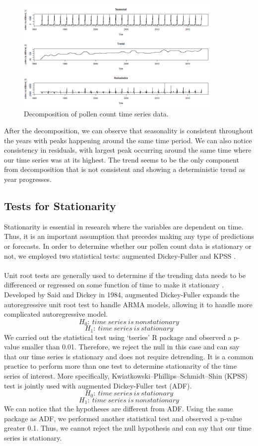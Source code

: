 \documentclass[a4paper,11pt]{article}
\begin{document}
\begin{figure}
	\centering
	\includegraphics[width=0.9\textwidth]{ExploratoryDecomp}
	\caption{Decomposition of pollen count time series data.}
	\label{fig:ExploratoryDecomp}
\end{figure}

\noindent
After the decomposition, we can observe that seasonality is consistent throughout the years with peaks happening around the same time period. We can also notice consistency in residuals, with largest peak occurring around the same time where our time series was at its highest. The trend seems to be the only component from decomposition that is not consistent and showing a deterministic trend as year progresses.

\subsection{Tests for Stationarity}

Stationarity is essential in research where the variables are dependent on time. Thus, it is an important assumption that precedes making any type of predictions or forecasts. In order to determine whether our pollen count data is stationary or not, we employed two statistical tests: augmented Dickey-Fuller and KPSS \cite{keblowski2004adf}.\\\\
Unit root tests are generally used to determine if the trending data needs to be differenced or regressed on some function of time to make it stationary \cite{diebold2000unit}. Developed by Said and Dickey in 1984, augmented Dickey-Fuller expands the autoregressive unit root test to handle ARMA models, allowing it to handle more complicated autoregressive model.
$$H_0:\ time\  series\  is\  nonstationary$$
$$H_1:\ time\ series\ is\ stationary$$
We carried out the statistical test using `tseries' R package and observed a p-value smaller than 0.01. Therefore, we reject the null in this case and can say that our time series is stationary and does not require detrending. It is a common practice to perform more than one test to determine stationarity of the time series of interest. More specifically, Kwiatkowski–Phillips–Schmidt–Shin (KPSS) test is jointly used with augmented Dickey-Fuller test (ADF). 
$$H_0:\ time\ series\ is\ stationary$$
$$H_1:\ time\  series\  is\  nonstationary$$
We can notice that the hypotheses are different from ADF. Using the same package as ADF, we performed another statistical test and observed a p-value greater 0.1. Thus, we cannot reject the null hypothesis and can say that our time series is stationary. 
\end{document}
